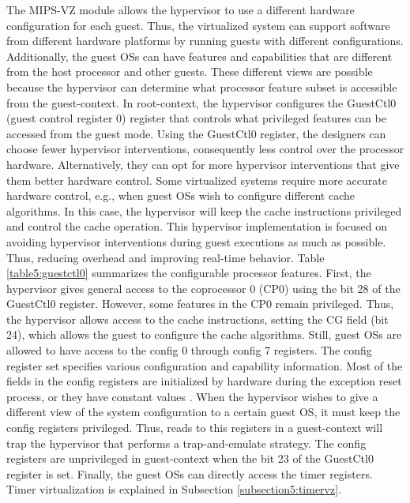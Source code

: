 The MIPS-VZ module allows the hypervisor to use a different hardware configuration for each guest. Thus, the virtualized system can support software from different hardware platforms by running guests with different configurations. Additionally, the guest OSs can have features and capabilities that are different from the host processor and other guests. These different views are possible because the hypervisor can determine what processor feature subset is accessible from the guest-context. In root-context, the hypervisor configures the GuestCtl0 (guest control register 0) register that controls what privileged features can be accessed from the guest mode. 
Using the GuestCtl0 register, the designers can choose fewer hypervisor interventions, consequently less control over the processor hardware. Alternatively, they can opt for more hypervisor interventions that give them better hardware control. Some virtualized systems require more accurate hardware control, e.g., when guest OSs wish to configure different cache algorithms. In this case, the hypervisor will keep the cache instructions privileged and control the cache operation. This hypervisor implementation is focused on avoiding hypervisor interventions during guest executions as much as possible. Thus, reducing overhead and improving real-time behavior.  Table \ref{table5:guestctl0} summarizes the configurable processor features.  First, the hypervisor gives general access to the coprocessor 0 (CP0) using the bit 28 of the GuestCtl0 register. However, some features in the CP0 remain privileged. Thus, the hypervisor allows access to the cache instructions, setting the CG field (bit 24), which allows the guest to configure the cache algorithms. Still, guest OSs are allowed to have access to the config 0 through config 7 registers. The config register set specifies various configuration and capability information. Most of the fields in the config registers are initialized by hardware during the exception reset process, or they have constant values \cite{m5150}. When the hypervisor wishes to give a different view of the system configuration to a certain guest OS, it must keep the config registers privileged. Thus, reads to this registers in a guest-context will trap the hypervisor that performs a trap-and-emulate strategy. The config registers are unprivileged in guest-context when the bit 23 of the GuestCtl0 register is set. Finally, the guest OSs can directly access  the timer registers. Timer virtualization is explained in Subsection \ref{subsection5:timervz}.

